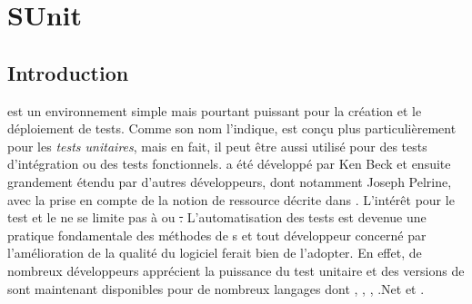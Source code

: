 \documentclass[a4paper,10pt,twoside]{book}
\begin{document}
	\sloppy
\fi
\newcommand{\aconfirmer}[1]{#1}
\chapter{SUnit}

\section{Introduction}


 est un environnement simple mais pourtant puissant 
pour la création et le déploiement de tests.
Comme son nom l'indique, \sunit est conçu plus particulièrement pour les \emph{tests unitaires},
mais en fait, il peut être aussi utilisé pour des tests d'intégration ou des tests fonctionnels. 
\sunit a été développé par Ken Beck et ensuite grandement étendu par d'autres développeurs, dont notamment Joseph Pelrine, avec la prise en compte de la notion de ressource décrite dans . 
L'intérêt pour le test et le  ne se limite pas à \pharo ou \st.
L'automatisation des tests est devenue une pratique fondamentale des
méthodes de s et 
tout développeur concerné par l'amélioration de la qualité du logiciel ferait bien de l'adopter.  
En effet, de nombreux développeurs apprécient la puissance du test unitaire et des versions de \xUnit{} sont maintenant disponibles pour de nombreux langages dont , , , .Net et .
\end{document}
